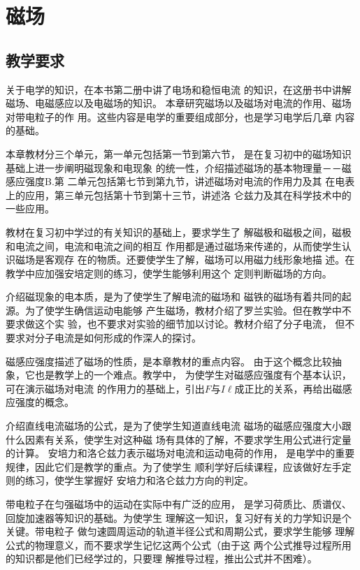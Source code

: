 
\chapter{磁场}
\minitoc[n]
\section{教学要求}
关于电学的知识，在本书第二册中讲了电场和稳恒电流
的知识，在这册书中讲解磁场、电磁感应以及电磁场的知识。
本章研究磁场以及磁场对电流的作用、磁场对带电粒子的作
用。这些内容是电学的重要组成部分，也是学习电学后几章
内容的基础。

本章教材分三个单元，第一单元包括第一节到第六节，
是在复习初中的磁场知识基础上进一步阐明磁现象和电现象
的统一性，介绍描述磁场的基本物理量－－磁感应强度B.第
二单元包括第七节到第九节，讲述磁场对电流的作用力及其
在电表上的应用，第三单元包括第十节到第十三节，讲述洛
仑兹力及其在科学技术中的一些应用。

教材在复习初中学过的有关知识的基础上，要求学生了
解磁极和磁极之间，磁极和电流之间，电流和电流之间的相互
作用都是通过磁场来传递的，从而使学生认识磁场是客观存
在的物质。还要使学生了解，磁场可以用磁力线形象地描
述。在教学中应加强安培定则的练习，使学生能够利用这个
定则判断磁场的方向。

介绍磁现象的电本质，是为了使学生了解电流的磁场和
磁铁的磁场有着共同的起源。为了使学生确信运动电能够
产生磁场，教材介绍了罗兰实验。但在教学中不要求做这个实
验，也不要求对实验的细节加以讨论。教材介绍了分子电流，
但不要求对分子电流是如何形成的作深人的探讨。

磁感应强度描述了磁场的性质，是本章教材的重点内容。
由于这个概念比较抽象，它也是教学上的一个难点。教学中，
为使学生对磁感应强度有个基本认识，可在演示磁场对电流
的作用力的基础上，引出$F$与$I\ell$成正比的关系，再给出磁感
应强度的概念。

介绍直线电流磁场的公式，是为了使学生知道直线电流
磁场的磁感应强度大小跟什么因素有关系，使学生对这种磁
场有具体的了解，不要求学生用公式进行定量的计算。
安培力和洛仑兹力表示磁场对电流和运动电荷的作用，
是电学中的重要规律，因此它们是教学的重点。为了使学生
顺利学好后续课程，应该做好左手定则的练习，使学生掌握好
安培力和洛仑兹力方向的判定。

带电粒子在匀强磁场中的运动在实际中有广泛的应用，
是学习荷质比、质谱仪、回旋加速器等知识的基础。为使学生
理解这一知识，复习好有关的力学知识是个关键。带电粒子
做匀速圆周运动的轨道半径公式和周期公式，要求学生能够
理解公式的物理意义，而不要求学生记忆这两个公式（由于这
两个公式推导过程所用的知识都是他们已经学过的，只要理
解推导过程，推出公式并不困难）。

